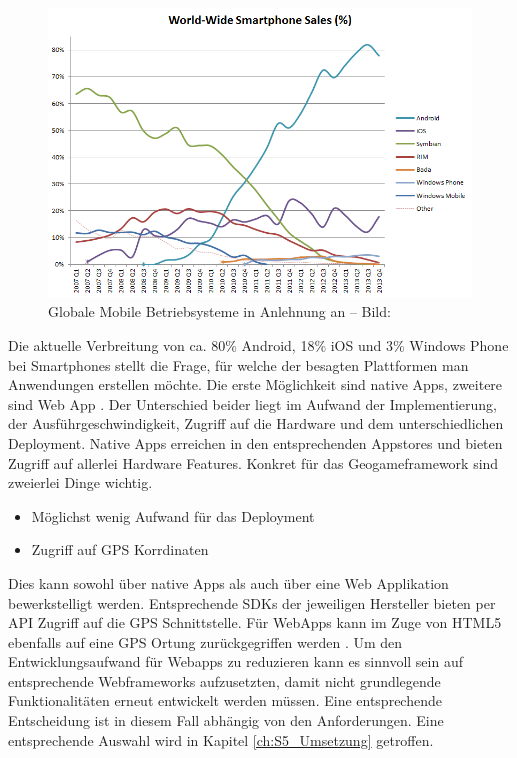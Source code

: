 \begin{figure}[H]
\begin{center}
\includegraphics[width=140mm]{images/ch4_img02_marketshare.png}
\caption{Globale Mobile Betriebsysteme in Anlehnung an \textcite{Gartner.2013} -- Bild: \cite{Wikipedia.2014}}
\label{img:ch4_img02_marketshare}
\end{center}
\end{figure}

Die aktuelle Verbreitung von ca. 80\% Android, 18\% iOS und 3\% Windows Phone bei Smartphones stellt die Frage, für welche der besagten Plattformen man Anwendungen erstellen möchte.
Die erste Möglichkeit sind native Apps, zweitere sind Web App \cite{Charland.2011}.
Der Unterschied beider liegt im Aufwand der Implementierung, der Ausführgeschwindigkeit, Zugriff auf die Hardware und dem unterschiedlichen Deployment.
Native Apps erreichen in den entsprechenden Appstores und bieten Zugriff auf allerlei Hardware Features.
Konkret für das Geogameframework sind zweierlei Dinge wichtig.

\begin{itemize}
\item Möglichst wenig Aufwand für das Deployment
\item Zugriff auf GPS Korrdinaten
\end{itemize}

Dies kann sowohl über native  Apps als auch über eine Web Applikation bewerkstelligt werden. Entsprechende SDKs der jeweiligen Hersteller bieten per API Zugriff auf die GPS Schnittstelle. Für WebApps kann im Zuge von HTML5 ebenfalls auf eine GPS Ortung zurückgegriffen werden \cite{Holdener.2011}. Um den Entwicklungsaufwand für Webapps zu reduzieren kann es sinnvoll sein auf entsprechende Webframeworks aufzusetzten, damit nicht grundlegende Funktionalitäten erneut entwickelt werden müssen.
Eine entsprechende Entscheidung ist in diesem Fall abhängig von den Anforderungen. Eine entsprechende Auswahl wird in Kapitel \ref{ch:S5_Umsetzung} getroffen.

